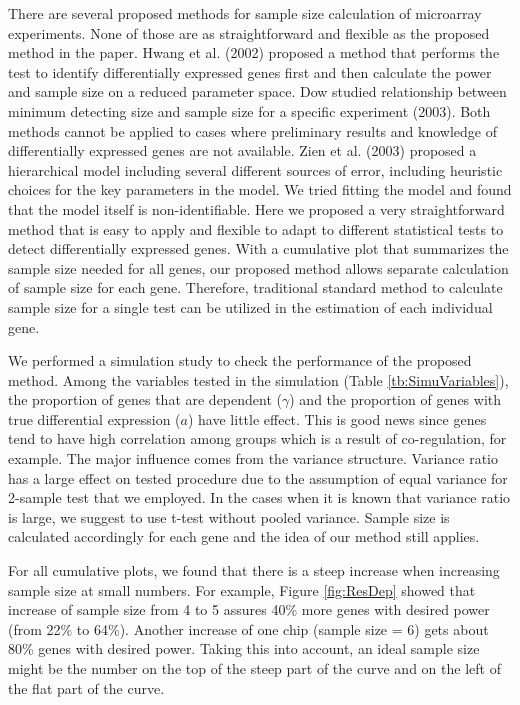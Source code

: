 \documentclass{bioinfo}
\begin{document}
There are several proposed methods for sample size calculation of
microarray experiments. None of those are as straightforward and
flexible as the proposed method in the paper. Hwang et al. (2002)
proposed a method that performs the test to identify
differentially expressed genes first and then calculate the power
and sample size on a reduced parameter space. Dow studied
relationship between minimum detecting size and sample size for a
specific experiment (2003). Both methods cannot be applied to
cases where preliminary results and knowledge of differentially
expressed genes are not available. Zien et al. (2003) proposed a
hierarchical model including several different sources of error,
including heuristic choices for the key parameters in the model.
We tried fitting the model and found that the model itself is
non-identifiable. Here we proposed a very straightforward method
that is easy to apply and flexible to adapt to different
statistical tests to detect differentially expressed genes. With a
cumulative plot that summarizes the sample size needed for all
genes, our proposed method allows separate calculation of sample
size for each gene. Therefore, traditional standard method to
calculate sample size for a single test can be utilized in the
estimation of each individual gene.

We performed a simulation study to check the performance of the
proposed method. Among the variables tested in the simulation
(Table \ref{tb:SimuVariables}), the proportion of genes that are
dependent ($\gamma$) and the proportion of genes with true
differential expression ($a$) have little effect. This is good
news since genes tend to have high correlation among groups which
is a result of co-regulation, for example. The major influence
comes from the variance structure. Variance ratio has a large
effect on tested procedure due to the assumption of equal variance
for 2-sample test that we employed. In the cases when it is known
that variance ratio is large, we suggest to use t-test without
pooled variance. Sample size is calculated accordingly for each
gene and the idea of our method still applies.

For all cumulative plots, we found that there is a steep increase
when increasing sample size at small numbers. For example, Figure
\ref{fig:ResDep} showed that increase of sample size from 4 to 5
assures 40\% more genes with desired power (from 22\% to 64\%).
Another increase of one chip (sample size = 6) gets about 80\%
genes with desired power. Taking this into account, an ideal
sample size might be the number on the top of the steep part of
the curve and on the left of the flat part of the curve.
\end{document}

